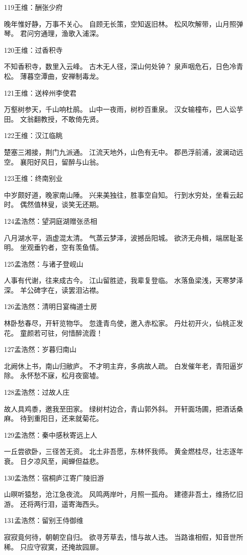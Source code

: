 119王维：酬张少府

晚年惟好静，万事不关心。
自顾无长策，空知返旧林。
松风吹解带，山月照弹琴。
君问穷通理，渔歌入浦深。

120王维：过香积寺

不知香积寺，数里入云峰。
古木无人径，深山何处钟？
泉声咽危石，日色冷青松。
薄暮空潭曲，安禅制毒龙。

121王维：送梓州李使君

万壑树参天，千山响杜鹃。
山中一夜雨，树杪百重泉。
汉女输橦布，巴人讼芋田。
文翁翻教授，不敢倚先贤。

122王维：汉江临眺

楚塞三湘接，荆门九派通。
江流天地外，山色有无中。
郡邑浮前浦，波澜动远空。
襄阳好风日，留醉与山翁。

123王维：终南别业

中岁颇好道，晚家南山陲。
兴来美独往，胜事空自知。
行到水穷处，坐看云起时。
偶然值林叟，谈笑无还期。

124孟浩然：望洞庭湖赠张丞相

八月湖水平，涵虚混太清。
气蒸云梦泽，波撼岳阳城。
欲济无舟楫，端居耻圣明。
坐观垂钓者，空有羡鱼情。

125孟浩然：与诸子登岘山

人事有代谢，往来成古今。
江山留胜迹，我辈复登临。
水落鱼梁浅，天寒梦泽深。
羊公碑字在，读罢泪沾襟。

126孟浩然：清明日宴梅道士房

林卧愁春尽，开轩览物华。
忽逢青鸟使，邀入赤松家。
丹灶初开火，仙桃正发花。
童颜若可驻，何惜醉流霞！

127孟浩然：岁暮归南山

北阙休上书，南山归敝庐。
不才明主弃，多病故人疏。
白发催年老，青阳逼岁除。
永怀愁不寐，松月夜窗墟。

128孟浩然：过故人庄

故人具鸡黍，邀我至田家。
绿树村边合，青山郭外斜。
开轩面场圃，把酒话桑麻。
待到重阳日，还来就菊花。

129孟浩然：秦中感秋寄远上人

一丘尝欲卧，三径苦无资。
北土非吾愿，东林怀我师。
黄金燃桂尽，壮志逐年衰。
日夕凉风至，闻蝉但益悲。

130孟浩然：宿桐庐江寄广陵旧游

山暝听猿愁，沧江急夜流。
风鸣两岸叶，月照一孤舟。
建德非吾土，维扬忆旧游。
还将两行泪，遥寄海西头。

131孟浩然：留别王侍御维

寂寂竟何待，朝朝空自归。
欲寻芳草去，惜与故人违。
当路谁相假，知音世所稀。
只应守寂寞，还掩故园扉。

